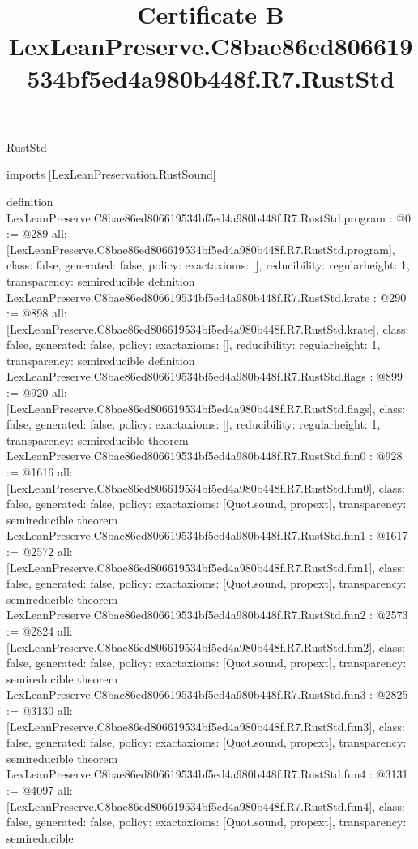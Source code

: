 \begin{lexlean}{RustStd}
\title{Certificate B LexLeanPreserve.C8bae86ed806619534bf5ed4a980b448f.R7.RustStd}
\begin{coremodule}
imports [LexLeanPreservation.RustSound]

definition LexLeanPreserve.C8bae86ed806619534bf5ed4a980b448f.R7.RustStd.program : @0 := @289 {
  all: [LexLeanPreserve.C8bae86ed806619534bf5ed4a980b448f.R7.RustStd.program],
  class: false,
  generated: false,
  policy: exact{axioms: []},
  reducibility: regular{height: 1},
  transparency: semireducible
}
definition LexLeanPreserve.C8bae86ed806619534bf5ed4a980b448f.R7.RustStd.krate : @290 := @898 {
  all: [LexLeanPreserve.C8bae86ed806619534bf5ed4a980b448f.R7.RustStd.krate],
  class: false,
  generated: false,
  policy: exact{axioms: []},
  reducibility: regular{height: 1},
  transparency: semireducible
}
definition LexLeanPreserve.C8bae86ed806619534bf5ed4a980b448f.R7.RustStd.flags : @899 := @920 {
  all: [LexLeanPreserve.C8bae86ed806619534bf5ed4a980b448f.R7.RustStd.flags],
  class: false,
  generated: false,
  policy: exact{axioms: []},
  reducibility: regular{height: 1},
  transparency: semireducible
}
theorem LexLeanPreserve.C8bae86ed806619534bf5ed4a980b448f.R7.RustStd.fun0 : @928 := @1616 {
  all: [LexLeanPreserve.C8bae86ed806619534bf5ed4a980b448f.R7.RustStd.fun0],
  class: false,
  generated: false,
  policy: exact{axioms: [Quot.sound, propext]},
  transparency: semireducible
}
theorem LexLeanPreserve.C8bae86ed806619534bf5ed4a980b448f.R7.RustStd.fun1 : @1617 := @2572 {
  all: [LexLeanPreserve.C8bae86ed806619534bf5ed4a980b448f.R7.RustStd.fun1],
  class: false,
  generated: false,
  policy: exact{axioms: [Quot.sound, propext]},
  transparency: semireducible
}
theorem LexLeanPreserve.C8bae86ed806619534bf5ed4a980b448f.R7.RustStd.fun2 : @2573 := @2824 {
  all: [LexLeanPreserve.C8bae86ed806619534bf5ed4a980b448f.R7.RustStd.fun2],
  class: false,
  generated: false,
  policy: exact{axioms: [Quot.sound, propext]},
  transparency: semireducible
}
theorem LexLeanPreserve.C8bae86ed806619534bf5ed4a980b448f.R7.RustStd.fun3 : @2825 := @3130 {
  all: [LexLeanPreserve.C8bae86ed806619534bf5ed4a980b448f.R7.RustStd.fun3],
  class: false,
  generated: false,
  policy: exact{axioms: [Quot.sound, propext]},
  transparency: semireducible
}
theorem LexLeanPreserve.C8bae86ed806619534bf5ed4a980b448f.R7.RustStd.fun4 : @3131 := @4097 {
  all: [LexLeanPreserve.C8bae86ed806619534bf5ed4a980b448f.R7.RustStd.fun4],
  class: false,
  generated: false,
  policy: exact{axioms: [Quot.sound, propext]},
  transparency: semireducible
}
\end{coremodule}
\end{lexlean}
